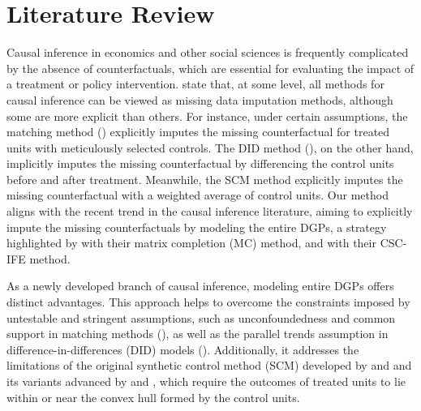 \documentclass[12pt]{article}
\begin{document}
\section{Literature Review} 
\label{sec: literature}
Causal inference in economics and other social sciences is frequently complicated by the absence of counterfactuals, which are essential for evaluating the impact of a treatment or policy intervention. \cite{imbens2015causal} state that, at some level, all methods for causal inference can be viewed as missing data imputation methods, although some are more explicit than others. For instance, under certain assumptions, the matching method (\cite{abadie2006large, abadie2011bias}) explicitly imputes the missing counterfactual for treated units with meticulously selected controls. The DID method (\cite{card1993minimum, ashenfelter1978estimating}), on the other hand, implicitly imputes the missing counterfactual by differencing the control units before and after treatment. Meanwhile, the SCM method explicitly imputes the missing counterfactual with a weighted average of control units. Our method aligns with the recent trend in the causal inference literature, aiming to explicitly impute the missing counterfactuals by modeling the entire DGPs, a strategy highlighted by \cite{athey2021matrix} with their matrix completion (MC) method, and \cite{xu2017generalized} with their CSC-IFE method.

As a newly developed branch of causal inference, modeling entire DGPs offers distinct advantages. This approach helps to overcome the constraints imposed by untestable and stringent assumptions, such as unconfoundedness and common support in matching methods (\cite{rosenbaum1983central, rubin1997estimating}), as well as the parallel trends assumption in difference-in-differences (DID) models (\cite{card1993minimum}). Additionally, it addresses the limitations of the original synthetic control method (SCM) developed by \cite{abadie2006large} and \cite{abadie2010synthetic} and its variants advanced by \cite{ben2021augmented} and \cite{arkhangelsky2021synthetic}, which require the outcomes of treated units to lie within or near the convex hull formed by the control units.
\end{document}
